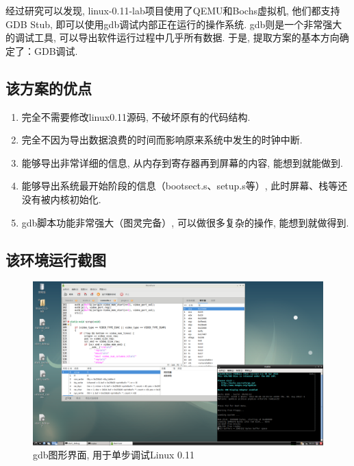 \documentclass{ctexart}
\begin{document}
经过研究可以发现, linux-0.11-lab项目使用了QEMU和Bochs虚拟机, 他们都支持GDB Stub, 即可以使用gdb调试内部正在运行的操作系统. gdb则是一个非常强大的调试工具, 可以导出软件运行过程中几乎所有数据. 于是, 提取方案的基本方向确定了：GDB调试. 

\subsection{该方案的优点}

\begin{enumerate}
	\item 完全不需要修改linux0.11源码, 不破坏原有的代码结构. 
	\item 完全不因为导出数据浪费的时间而影响原来系统中发生的时钟中断. 
	\item 能够导出非常详细的信息, 从内存到寄存器再到屏幕的内容, 能想到就能做到. 
	\item 能够导出系统最开始阶段的信息（bootsect.s、setup.s等）, 此时屏幕、栈等还没有被内核初始化. 
	\item gdb脚本功能非常强大（图灵完备）, 可以做很多复杂的操作, 能想到就做得到. 
\end{enumerate}

\subsection{该环境运行截图}
\begin{figure}[htbp]
	\centering
	\includegraphics[width=0.9\linewidth]{img/1.png}
	\caption[]{gdb图形界面, 用于单步调试Linux 0.11}
\end{figure}
\end{document}
